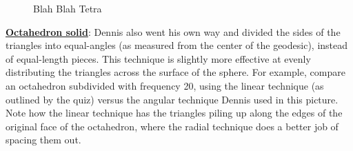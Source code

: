 \begin{center}
\begin{figure}[h]
\hfill
{}
\caption{Blah Blah Tetra}
\end{figure}
\end{center}
\clearpage
\newpage
\noindent\uline{\textbf{Octahedron solid}}:
Dennis also went his own way and divided the sides of the triangles into equal-angles (as measured from the center of the geodesic), instead of equal-length pieces. This technique is slightly more effective at evenly distributing the triangles across the surface of the sphere. For example, compare an octahedron subdivided with frequency 20, using the linear technique (as outlined by the quiz) versus the angular technique Dennis used in this picture. Note how the linear technique has the triangles piling up along the edges of the original face of the octahedron, where the radial technique does a better job of spacing them out.\\

